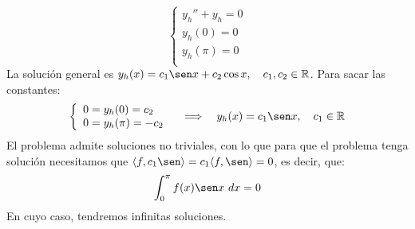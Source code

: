 \begin{ejemplo}
\begin{enumerate}
\begin{equation*}
            \left\{\begin{array}{l}
                y_h'' + y_h = 0 \\
                y_h(0) = 0 \\
                y_h(\pi) = 0 \\
            \end{array}\right.
        \end{equation*}
        La solución general es $y_h(x) = c_1\sen x + c_2 \cos x, \quad c_1,c_2\in \mathbb{R}$. Para sacar las constantes:
        \begin{equation*}
            \left\{\begin{array}{l}
                0 = y_h(0) = c_2 \\
                0 = y_h(\pi) = -c_2 \\
            \end{array}\right. \quad\Longrightarrow\quad y_h(x) = c_1\sen x, \quad c_1\in \mathbb{R}
        \end{equation*}
        El problema admite soluciones no triviales, con lo que para que el problema tenga solución necesitamos que $\langle f,c_1 \sen \rangle  = c_1 \langle f,\sen \rangle = 0$, es decir, que:
        \begin{equation*}
            \int_{0}^{\pi} f(x)\sen x~dx  = 0
        \end{equation*}
        En cuyo caso, tendremos infinitas soluciones.
    \end{enumerate}
\end{ejemplo}
